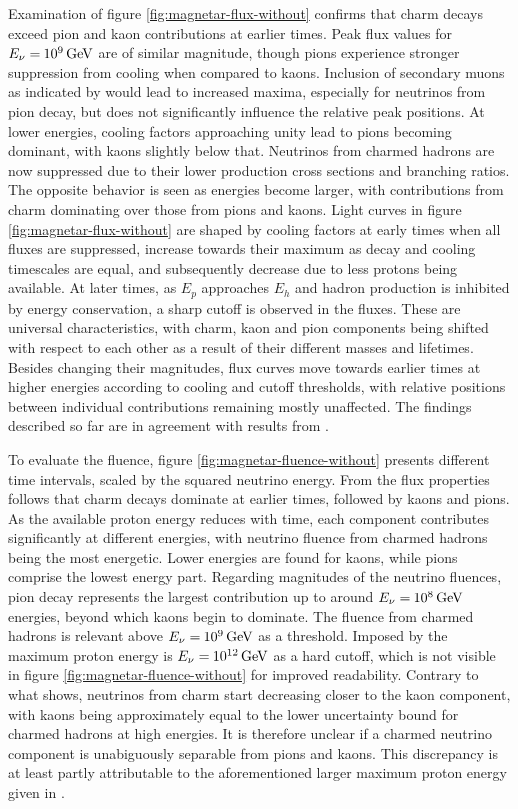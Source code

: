 Examination of figure \ref{fig:magnetar-flux-without} confirms that charm decays exceed pion and kaon contributions at earlier times.
Peak flux values for $E_\nu = \kern-0.5pt \qty{e9}{\giga\electronvolt}$ are of similar magnitude, though pions experience stronger
suppression from cooling when compared to kaons. Inclusion of secondary muons as indicated by \cite{Carpio_2020} would
lead to increased maxima, especially for neutrinos from pion decay, but does not significantly influence the relative peak positions.
At lower energies, cooling factors approaching unity lead to pions becoming dominant, with kaons slightly below that. Neutrinos
from charmed hadrons are now suppressed due to their lower production cross sections and branching ratios. The opposite behavior
is seen as energies become larger, with contributions from charm dominating over those from pions and kaons. Light curves in figure
\ref{fig:magnetar-flux-without} are shaped by cooling factors at early times when all fluxes are suppressed, increase towards their
maximum as decay and cooling timescales are equal, and subsequently decrease due to less protons being available. At later times,
as $E_p$ approaches $E_h$ and hadron production is inhibited by energy conservation, a sharp cutoff is observed in the fluxes. These
are universal characteristics, with charm, kaon and pion components being shifted with respect to each other as a result of their
different masses and lifetimes. Besides changing their magnitudes, flux curves move towards earlier times at higher energies
according to cooling and cutoff thresholds, with relative positions between individual contributions remaining mostly unaffected. 
The findings described so far are in agreement with results from \cite{Carpio_2020}.

To evaluate the fluence, figure \ref{fig:magnetar-fluence-without} presents different time intervals, scaled by the squared neutrino
energy. From the flux properties follows that charm decays dominate at earlier times, followed by kaons and pions. As the available
proton energy reduces with time, each component contributes significantly at different energies, with neutrino fluence from
charmed hadrons being the most energetic. Lower energies are found for kaons, while pions comprise the lowest energy part.
Regarding magnitudes of the neutrino fluences, pion decay represents the largest contribution up to around
$E_\nu = \kern-0.5pt \smash{\qty{e8}{\giga\electronvolt}}$ energies, beyond which kaons begin to dominate. The fluence from
charmed hadrons is relevant above $E_\nu = \kern-0.5pt \smash{\qty{e9}{\giga\electronvolt}}$ as a threshold. Imposed by the maximum
proton energy is $E_\nu = \kern-0.5pt \smash{\qty{e12}{\giga\electronvolt}}$ as a hard cutoff, which is not visible in figure
\ref{fig:magnetar-fluence-without} for improved readability. Contrary to what \cite{Carpio_2020} shows, neutrinos from charm
start decreasing closer to the kaon component, with kaons being approximately equal to the lower uncertainty bound for charmed
hadrons at high energies. It is therefore unclear if a charmed neutrino component is unabiguously separable from pions and
kaons. This discrepancy is at least partly attributable to the aforementioned larger maximum proton energy given in \cite{Carpio_2020}.

